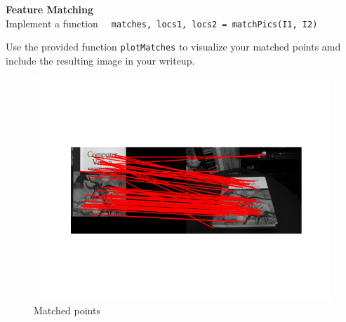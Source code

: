 \newpage
\begin{problem}
  \textbf{Feature Matching} \\
  Implement a function \verb|  matches, locs1, locs2 = matchPics(I1, I2)|
  
  Use the provided function \verb|plotMatches| to visualize your matched
  points amd include the resulting image in your writeup.

  \begin{figure}[H]
    \centering
    \begin{minipage}{0.9\textwidth}
      \includegraphics[width=\textwidth]{images/match-pics.png}
      \caption{Matched points}
      \label{fig:match-pics}
    \end{minipage}
  \end{figure}
\end{problem}

